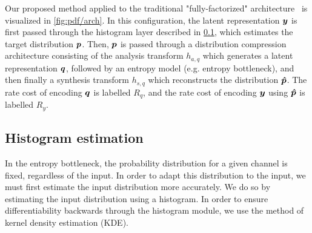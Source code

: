 Our proposed method applied to the traditional "fully-factorized" architecture~\cite{balle2018variational} is visualized in \cref{fig:pdf/arch}.
In this configuration, the latent representation ${\boldsymbol{y}}$ is first passed through the histogram layer described in \cref{sec:pdf_compression/histogram}, which estimates the target distribution ${\boldsymbol{p}}$.
Then, ${\boldsymbol{p}}$ is passed through a distribution compression architecture consisting of the analysis transform $h_{a,q}$ which generates
a latent representation ${\boldsymbol{q}}$, followed by an entropy model (e.g. entropy bottleneck), and then finally a synthesis transform $h_{s,q}$ which reconstructs the distribution ${\boldsymbol{\hat{p}}}$.
The rate cost of encoding ${\boldsymbol{q}}$ is labelled $R_{q}$, and the rate cost of encoding ${\boldsymbol{y}}$ using ${\boldsymbol{\hat{p}}}$ is labelled $R_{y}$.




\subsection{Histogram estimation}
\label{sec:pdf_compression/histogram}

In the entropy bottleneck, the probability distribution for a given channel is fixed, regardless of the input.
In order to adapt this distribution to the input, we must first estimate the input distribution more accurately.
We do so by estimating the input distribution using a histogram.
In order to ensure differentiability backwards through the histogram module, we use the method of kernel density estimation (KDE).



